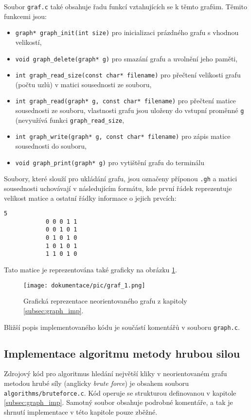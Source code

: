 \documentclass[a4paper]{article}
\begin{document}
        \noindent
        Soubor \lstinline{graf.c} také obsahuje řadu funkcí vztahujících se k těmto grafům. Těmito funkcemi jsou:
        \begin{itemize}
            \item \lstinline{graph* graph_init(int size)} pro inicializaci prázdného grafu s vhodnou velikostí,
            \item \lstinline{void graph_delete(graph* g)} pro smazání grafu a uvolnění jeho paměti,
            \item \lstinline{int graph_read_size(const char* filename)} pro přečtení velikosti grafu (počtu uzlů) v matici sousednosti ze souboru,
            \item \lstinline{int graph_read(graph* g, const char* filename)} pro přečtení matice sousednosti ze souboru, vlastnosti grafu jsou uloženy do vstupní proměnné \lstinline{g} (nevyužívá funkci \lstinline{graph_read_size},
            \item \lstinline{int graph_write(graph* g, const char* filename)} pro zápis matice sousednosti do souboru,
            \item \lstinline{void graph_print(graph* g)} pro vytištění grafu do terminálu
        \end{itemize}

        \noindent
        Soubory, které slouží pro ukládání grafu, jsou označeny příponou \lstinline{.gh} a matici sousednosti uchovávají v následujícím formátu, kde první řádek reprezentuje velikost matice a ostatní řádky informace o jejich prvcích:
        \begin{lstlisting}[caption={Zápis matice v \lstinline{.gh} souboru.},captionpos=b,label={code:zapis_matice}]
            5
            0 0 0 1 1
            0 0 1 0 1
            0 1 0 1 0
            1 0 1 0 1
            1 1 0 1 0
        \end{lstlisting}
        Tato matice je reprezentována také graficky na obrázku \ref{fig:graf1}.
        \begin{figure}[bh]
            \centering
            \texttt{[image: dokumentace/pic/graf\_1.png]}
            \caption{Grafická reprezentace neorientovaného grafu z kapitoly \ref{subsec:graph_imp}.}
            \label{fig:graf1}
        \end{figure}

        \noindent
        Bližší popis implementovaného kódu je součástí komentářů v souboru \lstinline{graph.c}.

    \subsection{Implementace algoritmu metody hrubou silou}
        Zdrojový kód pro algoritmus hledání největší kliky v neorientovaném grafu metodou hrubé síly (anglicky \textit{brute force}) je obsahem souboru \lstinline{algorithms/bruteforce.c}. Kód operuje se strukturou definovanou v kapitole \ref{subsec:graph_imp}. Samotný soubor obsahuje podrobné komentáře, a tak je shrnutí implementace v této kapitole pouze zběžné.\\
\end{document}
